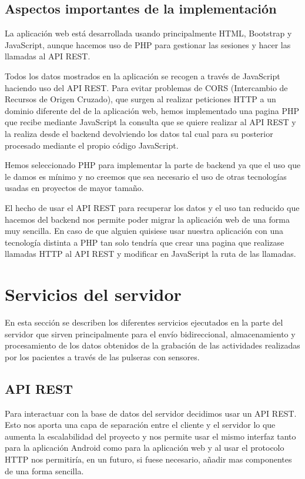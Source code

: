 \documentclass[11pt,spanish]{article}
\begin{document}
\subsection{Aspectos importantes de la implementación}

La aplicación web está desarrollada usando principalmente HTML, Bootstrap y JavaScript, aunque hacemos uso de PHP para gestionar las sesiones y hacer las llamadas al API REST.
\newline

Todos los datos mostrados en la aplicación se recogen a través de JavaScript haciendo uso del API REST. Para evitar problemas de CORS (Intercambio de Recursos de Origen Cruzado), que surgen al realizar peticiones HTTP a un dominio diferente del de la aplicación web, hemos implementado una pagina PHP que recibe mediante JavaScript la consulta que se quiere realizar al API REST y la realiza desde el backend devolviendo los datos tal cual para su posterior procesado mediante el propio código JavaScript.
\newline

Hemos seleccionado PHP para implementar la parte de backend ya que el uso que le damos es mínimo y no creemos que sea necesario el uso de otras tecnologías usadas en proyectos de mayor tamaño.
\newline

El hecho de usar el API REST para recuperar los datos y el uso tan reducido que hacemos del backend nos permite poder migrar la aplicación web de una forma muy sencilla. En caso de que alguien quisiese usar nuestra aplicación con una tecnología distinta a PHP tan solo tendría que crear una pagina que realizase llamadas HTTP al API REST y modificar en JavaScript la ruta de las llamadas.
\newpage


\section{Servicios del servidor}
En esta sección se describen los diferentes servicios ejecutados en la parte del servidor que sirven principalmente para el envío bidireccional, almacenamiento y procesamiento de los datos obtenidos de la grabación de las actividades realizadas por los pacientes a través de las pulseras con sensores.

\subsection{API REST}
Para interactuar con la base de datos del servidor decidimos usar un API REST. Esto nos aporta una capa de separación entre el cliente y el servidor lo que aumenta la escalabilidad del proyecto y nos permite usar el mismo interfaz tanto para la aplicación Android como para la aplicación web y al usar el protocolo HTTP nos permitiría, en un futuro, si fuese necesario, añadir mas componentes de una forma sencilla.
\end{document}
